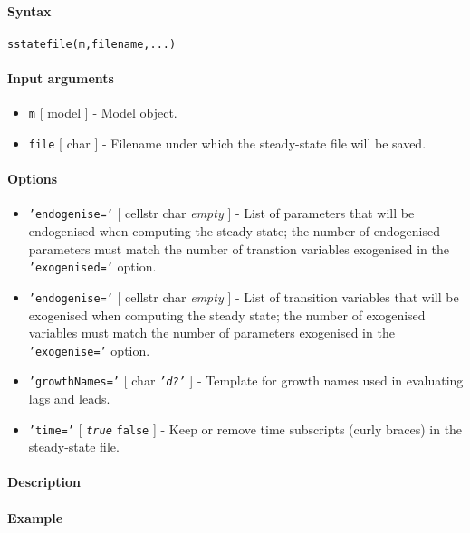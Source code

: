


	\paragraph{Syntax}

\begin{verbatim}
sstatefile(m,filename,...)
\end{verbatim}

\paragraph{Input arguments}

\begin{itemize}
\item
  \texttt{m} {[} model {]} - Model object.
\item
  \texttt{file} {[} char {]} - Filename under which the steady-state
  file will be saved.
\end{itemize}

\paragraph{Options}

\begin{itemize}
\item
  \texttt{'endogenise='} {[} cellstr \textbar{} char \textbar{}
  \emph{empty} {]} - List of parameters that will be endogenised when
  computing the steady state; the number of endogenised parameters must
  match the number of transtion variables exogenised in the
  \texttt{'exogenised='} option.
\item
  \texttt{'endogenise='} {[} cellstr \textbar{} char \textbar{}
  \emph{empty} {]} - List of transition variables that will be
  exogenised when computing the steady state; the number of exogenised
  variables must match the number of parameters exogenised in the
  \texttt{'exogenise='} option.
\item
  \texttt{'growthNames='} {[} char \textbar{} \emph{\texttt{'d?'}} {]} -
  Template for growth names used in evaluating lags and leads.
\item
  \texttt{'time='} {[} \emph{\texttt{true}} \textbar{} \texttt{false}
  {]} - Keep or remove time subscripts (curly braces) in the
  steady-state file.
\end{itemize}

\paragraph{Description}

\paragraph{Example}


